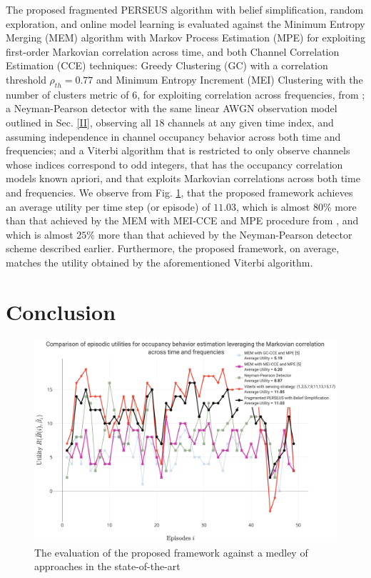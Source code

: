 \documentclass[10pt,twocolumn]{IEEEtran}
\begin{document}
The proposed fragmented PERSEUS algorithm with belief simplification, random exploration, and online model learning is evaluated against the Minimum Entropy Merging (MEM) algorithm with Markov Process Estimation (MPE) for exploiting first-order Markovian correlation across time, and both Channel Correlation Estimation (CCE) techniques: Greedy Clustering (GC) with a correlation threshold $\rho_{th}{=}0.77$ and Minimum Entropy Increment (MEI) Clustering with the number of clusters metric of $6$, for exploiting correlation across frequencies, from \cite{6956794}; a Neyman-Pearson detector with the same linear AWGN observation model outlined in Sec. \ref{II}, observing all $18$ channels at any given time index, and assuming independence in channel occupancy behavior across both time and frequencies; and a Viterbi algorithm that is restricted to only observe channels whose indices correspond to odd integers, that has the occupancy correlation models known apriori, and that exploits Markovian correlations across both time and frequencies. We observe from Fig. \ref{fig:7}, that the proposed framework achieves an average utility per time step (or episode) of $11.03$, which is almost $80$\% more than that achieved by the MEM with MEI-CCE and MPE procedure from \cite{6956794}, and which is almost $25$\% more than that achieved by the Neyman-Pearson detector scheme described earlier. Furthermore, the proposed framework, on average, matches the utility obtained by the aforementioned Viterbi algorithm. 
\section{Conclusion}\label{V}
\begin{figure}
    \centering
    \includegraphics[width=0.95\linewidth]{PerformanceEvaluation.png}
    \caption{The evaluation of the proposed framework against a medley of approaches in the state-of-the-art}
    \label{fig:7}
\end{figure}
\end{document}
